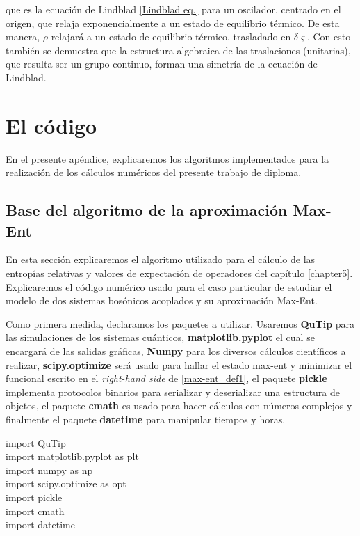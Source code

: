 \documentclass{report} %
\numberwithin{equation}{section}
\begin{document}
que es la ecuación de Lindblad \eqref{Lindblad eq.} para un oscilador, centrado en el origen, que relaja exponencialmente a un estado de equilibrio térmico. De esta manera, $\rho$ relajará a un estado de equilibrio térmico, trasladado en $\delta \varsigma$. Con esto también se demuestra que la estructura algebraica de las traslaciones (unitarias), que resulta ser un grupo continuo, forman una simetría de la ecuación de Lindblad.  

\chapter{El c\'odigo}
\label{AppendixB}

En el presente apéndice, explicaremos los algoritmos implementados para la realización de los cálculos numéricos del presente trabajo de diploma. 

\section{Base del algoritmo de la aproximaci\'on Max-Ent}

En esta sección explicaremos el algoritmo utilizado para el cálculo de las entropías relativas y valores de expectación de operadores del capítulo \ref{chapter5}. Explicaremos el código numérico usado para el caso particular de estudiar el modelo de dos sistemas bosónicos acoplados y su aproximación Max-Ent.

Como primera medida, declaramos los paquetes a utilizar. Usaremos \textbf{QuTip} para las simulaciones de los sistemas cuánticos, \textbf{matplotlib.pyplot} el cual se encargará de las salidas gráficas, \textbf{Numpy} para los diversos cálculos científicos a realizar, \textbf{scipy.optimize} será usado para hallar el estado max-ent y minimizar el funcional escrito en el \textit{right-hand side} de \eqref{max-ent_def1}, el paquete \textbf{pickle} implementa protocolos binarios para serializar y deserializar una estructura de objetos, el paquete \textbf{cmath} es usado para hacer cálculos con números complejos y finalmente el paquete \textbf{datetime} para manipular tiempos y horas.

\begin{tcolorbox}
import QuTip \\
import matplotlib.pyplot as plt \\
import numpy as np \\
import scipy.optimize as opt \\
import pickle \\
import cmath \\
import datetime 
\end{tcolorbox}
\end{document}
